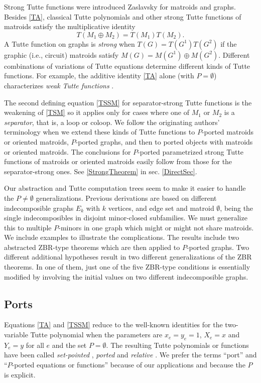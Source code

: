 \documentclass[12pt,leqno]{amsart}
\theoremstyle{remark}
\begin{document}
Strong Tutte functions
were introduced 
Zaslavsky\cite{MR93a:05047} for matroids and graphs.
Besides \eqref{TA}, classical Tutte polynomials and other 
strong Tutte
functions of matroids satisfy the multiplicative identity
\begin{equation}
\tag{TSM}
\label{TSM}
T(M_1\oplus M_2)=T(M_1)T(M_2).
\end{equation}
A Tutte function on graphs is \emph{strong} when
$T(G)=T(G^1)T(G^2)$ if the graphic (i.e., circuit)
matroids satisfy $M(G)=M(G^1)\oplus M(G^2)$.
Different combinations of variations of Tutte equations determine
different kinds of Tutte functions.  For example, the additive 
identity \eqref{TA} alone (with $P=\emptyset$) characterizes
\emph{weak Tutte functions} \cite{MR93a:05047,ZaslavskyOct18}.

The second defining equation \eqref{TSSM} for separator-strong
Tutte functions is the weakening of \eqref{TSM}
so it applies only for cases where one of $M_1$ or $M_2$ is a 
\emph{separator}, that is, a loop or coloop.  
We follow the originating authors' terminology when we extend these
kinds of Tutte functions to $P$-ported matroids or oriented matroids,
$P$-ported graphs,
and then to ported objects 
with  matroids or oriented matroids.
The conclusions for $P$-ported parametrized
strong Tutte functions of matroids
or oriented matroids easily follow from those for the separator-strong ones.
See \ref{StrongTheorem} in sec. \ref{DirectSec}.

Our abstraction and Tutte computation
trees seem to make it easier to handle
the $P\neq\emptyset$ generalizations.
Previous derivations \cite{Ellis-Monaghan-Traldi}
are based on different indecomposible graphs
$E_k$ with $k$ vertices,
and edge set and matroid $\emptyset$, being the
single indecomposibles in disjoint minor-closed
subfamilies.  We must generalize this to
multiple $P$-minors in one graph which might
or might not share matroids.
We include examples to illustrate the complications.
The results include two abstracted ZBR-type theorems
which are then applied to $P$-ported graphs.  
Two different additional hypotheses result in two
different generalizations of the ZBR theorems.
In one of them,
just one of the five ZBR-type conditions is essentially
modified by involving the initial values on two different
indecomposible graphs. 

\subsection{Ports} 
Equations \eqref{TA} and \eqref{TSSM}
reduce to the well-known identities for the 
two-variable Tutte polynomial
when the parameters are $x_e=y_e=1$, $X_e=x$ and $Y_e=y$ for all $e$ and 
the set $P=\emptyset$.
The resulting Tutte polynomials or functions
have been called \emph{set-pointed} \cite{SetPointedLV,SetPointedLV1}, 
\emph{ported} \cite{sdcPorted,TutteEx} and 
\emph{relative} \cite{RelTuttePoly}.  
We prefer the terms ``port'' and ``$P$-ported equations
or functions'' because of our applications
\cite{sdcOMP,TutteEx} and because 
the $P$ is explicit.
\end{document}
